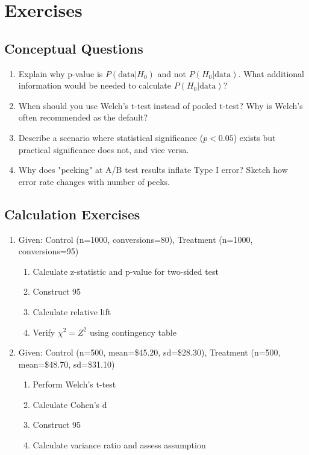 \section{Exercises}

\subsection{Conceptual Questions}

\begin{enumerate}
    \item Explain why p-value is $P(\text{data}|H_0)$ and not $P(H_0|\text{data})$. What additional information would be needed to calculate $P(H_0|\text{data})$?

    \item When should you use Welch's t-test instead of pooled t-test? Why is Welch's often recommended as the default?

    \item Describe a scenario where statistical significance ($p < 0.05$) exists but practical significance does not, and vice versa.

    \item Why does "peeking" at A/B test results inflate Type I error? Sketch how error rate changes with number of peeks.
\end{enumerate}

\subsection{Calculation Exercises}

\begin{enumerate}
    \item Given: Control (n=1000, conversions=80), Treatment (n=1000, conversions=95)
    \begin{enumerate}
        \item Calculate z-statistic and p-value for two-sided test
        \item Construct 95%
        \item Calculate relative lift
        \item Verify $\chi^2 = Z^2$ using contingency table
    \end{enumerate}

    \item Given: Control (n=500, mean=\$45.20, sd=\$28.30), Treatment (n=500, mean=\$48.70, sd=\$31.10)
    \begin{enumerate}
        \item Perform Welch's t-test
        \item Calculate Cohen's d
        \item Construct 95%
        \item Calculate variance ratio and assess assumption
    \end{enumerate}
\end{enumerate}

